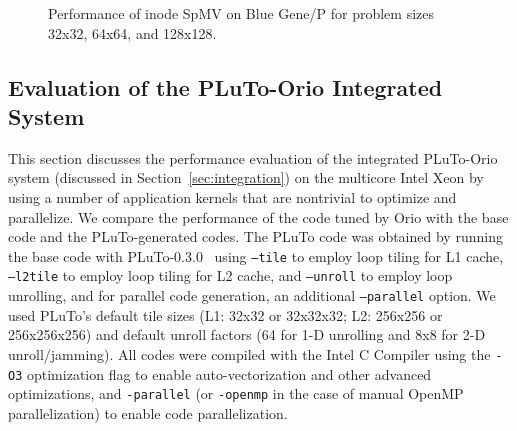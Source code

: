 {\begin{figure}
\begin{center}
{  \label{fig:ex27-bgp-vn-64x64} 
  } 
\end{center}
\vspace{-.2in}
\caption{Performance of inode SpMV on Blue Gene/P for problem sizes 32x32, 64x64, and 128x128.} 
\label{fig:ex27-bgp-results2} 
\end{figure} 
}

\subsection{Evaluation of the PLuTo-Orio Integrated System} 

This section discusses the performance evaluation of the integrated
PLuTo-Orio system (discussed in Section~\ref{sec:integration}) on the
multicore Intel Xeon by using a number of application kernels that are
nontrivial to optimize and parallelize. We compare the performance of the
code tuned by Orio with the base code and the PLuTo-generated codes. The
PLuTo code was obtained by running the base code with
PLuTo-0.3.0~\cite{pluto030} using \texttt{--tile} to employ loop tiling for
L1 cache, \texttt{--l2tile} to employ loop tiling for L2 cache, and
\texttt{--unroll} to employ loop unrolling, and for parallel code generation,
an additional \texttt{--parallel} option. We used PLuTo's default tile
sizes (L1: 32x32 or 32x32x32; L2: 256x256 or 256x256x256) and default
unroll factors (64 for 1-D unrolling and 8x8 for 2-D
unroll/jamming). All codes were compiled with the Intel C Compiler
using the \texttt{-O3} optimization flag to enable auto-vectorization
and other advanced optimizations, and
\texttt{-parallel} (or \texttt{-openmp} in the case of manual OpenMP parallelization) 
to enable code parallelization.
 
